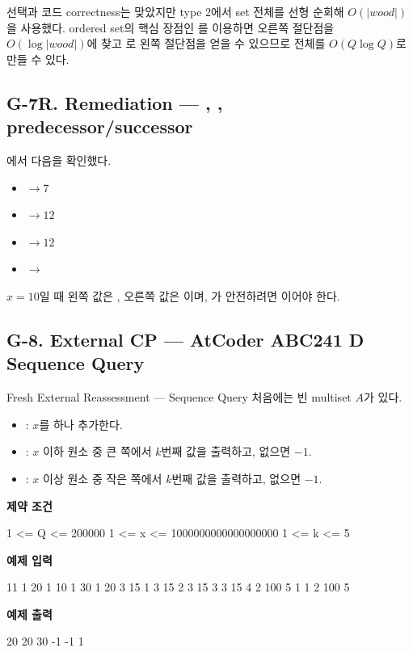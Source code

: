 \begin{notebox}
 선택과 코드 correctness는 맞았지만 type 2에서 set 전체를 선형 순회해 $O(|wood|)$을 사용했다. ordered set의 핵심 장점인 를 이용하면 오른쪽 절단점을 $O(\log |wood|)$에 찾고 로 왼쪽 절단점을 얻을 수 있으므로 전체를 $O(Q\log Q)$로 만들 수 있다.
\end{notebox}

\subsection{G-7R. Remediation --- , , predecessor/successor}
에서 다음을 확인했다.
\begin{itemize}
\item {} $\to 7$
\item {} $\to 12$
\item {} $\to 12$
\item {} $\to$ 
\end{itemize}
$x=10$일 때 왼쪽 값은 , 오른쪽 값은 이며, 가 안전하려면 이어야 한다.

\subsection{G-8. External CP --- AtCoder ABC241 D Sequence Query}
\begin{problembox}{Fresh External Reassessment --- Sequence Query}
처음에는 빈 multiset $A$가 있다.
\begin{itemize}
\item {}: $x$를 하나 추가한다.
\item {}: $x$ 이하 원소 중 큰 쪽에서 $k$번째 값을 출력하고, 없으면 $-1$.
\item {}: $x$ 이상 원소 중 작은 쪽에서 $k$번째 값을 출력하고, 없으면 $-1$.
\end{itemize}

\textbf{제약 조건}
\begin{TextBlock}
1 <= Q <= 200000
1 <= x <= 1000000000000000000
1 <= k <= 5
\end{TextBlock}

\textbf{예제 입력}
\begin{TextBlock}
11
1 20
1 10
1 30
1 20
3 15 1
3 15 2
3 15 3
3 15 4
2 100 5
1 1
2 100 5
\end{TextBlock}

\textbf{예제 출력}
\begin{TextBlock}
20
20
30
-1
-1
1
\end{TextBlock}
\end{problembox}

